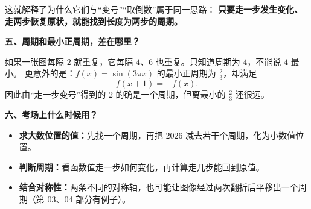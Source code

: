 \begin{explanationbox}
这就解释了为什么它们与“变号”“取倒数”属于同一思路：
\textbf{只要走一步发生变化、走两步恢复原状，就能找到长度为两步的周期。}

\end{explanationbox}\clearpage\begin{explanationbox}\textbf{五、周期和最小正周期，差在哪里？}



如果一张图每隔 $2$ 就重复，它每隔 $4$、$6$ 也重复。只知道周期为 $4$，不能说 $4$ 最小。
更意外的是：$f(x)=\sin(3\pi x)$ 的最小正周期为 $\frac23$，却满足
\[f(x+1)=-f(x).\]
因此由“走一步变号”得到的 $2$ 的确是一个周期，但离最小的 $\frac23$ 还很远。


\end{explanationbox}\clearpage\begin{explanationbox}\textbf{六、考场上什么时候用？}


\begin{itemize}[leftmargin=*,itemsep=0.45em]
\item \textbf{求大数位置的值：}先找一个周期，再把 $2026$ 减去若干个周期，化为小数值位置。
\item \textbf{判断周期：}看函数值走一步如何变化，再计算走几步能回到原值。
\item \textbf{结合对称性：}两条不同的对称轴，也可能让图像经过两次翻折后平移出一个周期（第 03、04 部分有例子）。
\end{itemize}
\end{explanationbox}
